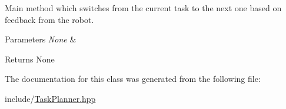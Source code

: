Main method which switches from the current task to the next one based on feedback from the robot. 


\begin{DoxyParams}{Parameters}
{\em None} & \\
\hline
\end{DoxyParams}
\begin{DoxyReturn}{Returns}
None 
\end{DoxyReturn}


The documentation for this class was generated from the following file\+:\begin{DoxyCompactItemize}
\item 
include/\hyperlink{TaskPlanner_8hpp}{Task\+Planner.\+hpp}\end{DoxyCompactItemize}

